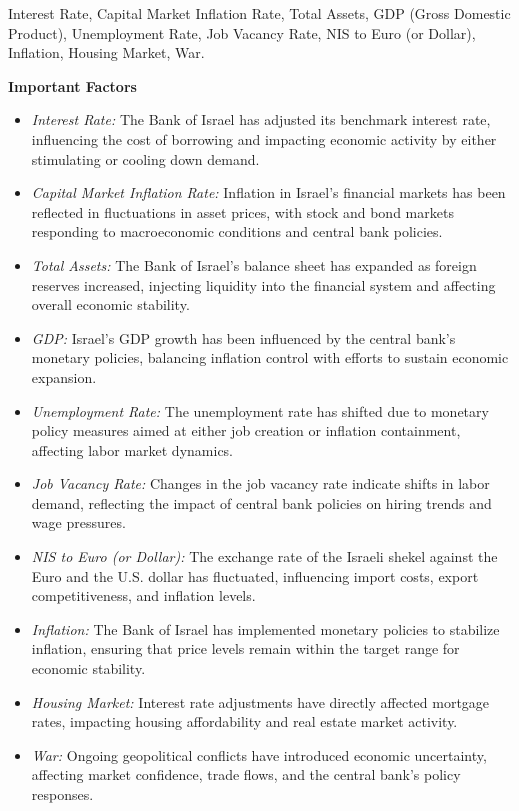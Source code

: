 
 Interest Rate, Capital Market Inflation Rate, Total Assets, GDP (Gross Domestic Product), Unemployment Rate, Job Vacancy Rate, NIS to Euro (or Dollar), Inflation, Housing Market, War.

\textbf{Important Factors}
\begin{itemize}
    \item \textit{Interest Rate:} The Bank of Israel has adjusted its benchmark interest rate, influencing the cost of borrowing and impacting economic activity by either stimulating or cooling down demand.
    \item \textit{Capital Market Inflation Rate:} Inflation in Israel's financial markets has been reflected in fluctuations in asset prices, with stock and bond markets responding to macroeconomic conditions and central bank policies.
    \item \textit{Total Assets:} The Bank of Israel's balance sheet has expanded as foreign reserves increased, injecting liquidity into the financial system and affecting overall economic stability.
    \item \textit{GDP:} Israel’s GDP growth has been influenced by the central bank’s monetary policies, balancing inflation control with efforts to sustain economic expansion.
    \item \textit{Unemployment Rate:} The unemployment rate has shifted due to monetary policy measures aimed at either job creation or inflation containment, affecting labor market dynamics.
    \item \textit{Job Vacancy Rate:} Changes in the job vacancy rate indicate shifts in labor demand, reflecting the impact of central bank policies on hiring trends and wage pressures.
    \item \textit{NIS to Euro (or Dollar):} The exchange rate of the Israeli shekel against the Euro and the U.S. dollar has fluctuated, influencing import costs, export competitiveness, and inflation levels.
    \item \textit{Inflation:} The Bank of Israel has implemented monetary policies to stabilize inflation, ensuring that price levels remain within the target range for economic stability.
    \item \textit{Housing Market:} Interest rate adjustments have directly affected mortgage rates, impacting housing affordability and real estate market activity.
    \item \textit{War:} Ongoing geopolitical conflicts have introduced economic uncertainty, affecting market confidence, trade flows, and the central bank’s policy responses.
\end{itemize}


